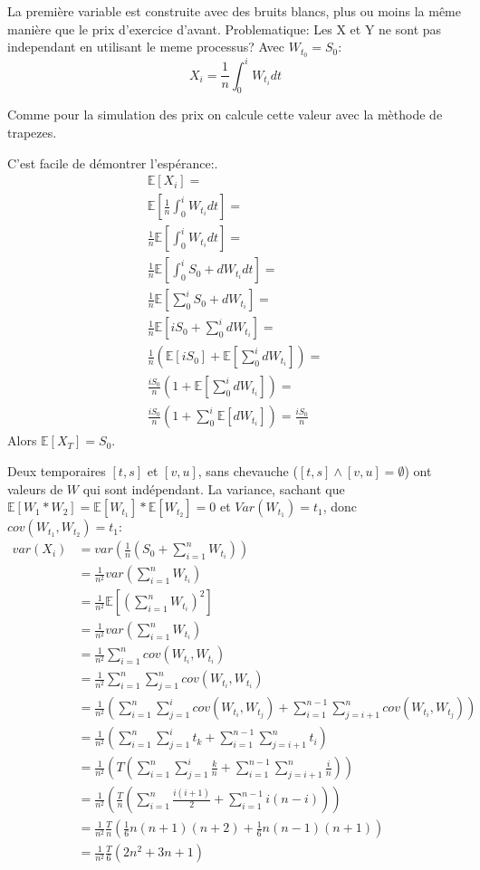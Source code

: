 \documentclass[a4paper,12pt]{scrartcl}
\begin{document}
La première variable est construite avec des bruits blancs, plus ou moins la même manière que le prix d'exercice d'avant.
Problematique: Les X et Y ne sont pas independant en utilisant le meme processus?
Avec $W_{t_0} = S_0$:
$$X_i = \frac{1}{n}\int_0^i W_{t_i} dt$$

Comme pour la simulation des prix on calcule cette valeur avec la mèthode de trapezes. 

C'est facile de démontrer l'espérance:.
\begin{align*}
\mathbb{E}[X_i]= \\
\mathbb{E}[\frac{1}{n}\int_0^i W_{t_i} dt] =\\
\frac{1}{n}\mathbb{E}[\int_0^i W_{t_i} dt] =\\
\frac{1}{n}\mathbb{E}[\int_0^i S_0 + dW_{t_i} dt] =\\
\frac{1}{n}\mathbb{E}[\sum_0^i S_0 + dW_{t_i} ] =\\
\frac{1}{n}\mathbb{E}[iS_0 + \sum_0^i dW_{t_i} ] =\\
\frac{1}{n}(\mathbb{E}[iS_0] + \mathbb{E}[\sum_0^i dW_{t_i} ]) =\\
\frac{iS_0}{n}(1 + \mathbb{E}[\sum_0^i dW_{t_i} ]) =\\
\frac{iS_0}{n}(1 + \sum_0^i\mathbb{E}[ dW_{t_i} ]) =
\frac{iS_0}{n}
\end{align*}
Alors $\mathbb{E}[X_T]=S_0$.

Deux temporaires $[t, s]$ et $[v, u]$, sans chevauche ($[t, s] \wedge [v, u] = \emptyset$) ont valeurs de $W$ qui sont indépendant.
La variance, sachant que $\mathbb{E}[W_1*W_2] =\mathbb{E}[W_{t_1}]*\mathbb{E}[W_{t_2}] =0$ et $Var(W_{t_1}) = t_1$, donc  $cov(W_{t_1}, W_{t_2}) = t_1$:
\begin{align*}
var(X_i)
&= var(\frac{1}{n}(S_0 + \sum_{i=1}^{n} W_{t_i})) \\
&= \frac{1}{n^2}var(\sum_{i=1}^{n} W_{t_i}) \\
&= \frac{1}{n^2}\mathbb{E}[(\sum_{i=1}^{n} W_{t_i})^2] \\
&= \frac{1}{n^2}var(\sum_{i=1}^{n} W_{t_i}) \\
&= \frac{1}{n^2}\sum_{i=1}^n cov(W_{t_i}, W_{t_i}) \\
&= \frac{1}{n^2}\sum_{i=1}^n \sum_{j=1}^n cov(W_{t_i}, W_{t_i}) \\
&= \frac{1}{n^2} (\sum_{i=1}^n \sum_{j=1}^i cov(W_{t_i}, W_{t_j}) + \sum_{i=1}^{n-1} \sum_{j=i+1}^n cov(W_{t_i}, W_{t_j})) \\
&= \frac{1}{n^2} (\sum_{i=1}^n \sum_{j=1}^i t_k + \sum_{i=1}^{n-1} \sum_{j=i+1}^n t_i) \\
&=\frac{1}{n^2}( T(\sum_{i=1}^n \sum_{j=1}^i \frac{k}{n} + \sum_{i=1}^{n-1} \sum_{j=i+1}^n \frac{i}{n})) \\
&= \frac{1}{n^2}(\frac{T}{n}(\sum_{i=1}^n \frac{i(i+1)}{2} + \sum_{i=1}^{n-1} i(n-i))) \\
&= \frac{1}{n^2}\frac{T}{n}(\frac{1}{6}n(n+1)(n+2)+\frac{1}{6}n(n-1)(n+1)) \\
&= \frac{1}{n^2}\frac{T}{6}(2n^2+3n+1)
\end{align*}
\end{document}
